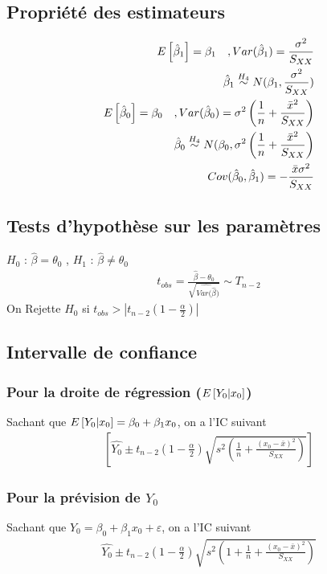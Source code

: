 \documentclass[10pt, french]{article}
\begin{document}
\begin{multicols*}{3}
\subsection*{Propriété des estimateurs}
\begin{align*}
E \left[ \hat{\beta}_1 \right] = \beta_1 \quad , Var(\hat{\beta}_1) = \frac{\sigma^2}{S_{XX}} \\
\hat{\beta}_1 \overset{H_4}{\sim} N(\beta_1, \frac{\sigma^2}{S_{XX}}) \\
E \left[ \hat{\beta}_0 \right] = \beta_0 \quad , Var(\hat{\beta}_0) = \sigma^2 \left( \frac{1}{n} + \frac{\bar{x}^2}{S_{XX}} \right) \\
\hat{\beta}_0 \overset{H_4}{\sim} N(\beta_0, \sigma^2 \left( \frac{1}{n}  + \frac{\bar{x}^2}{S_{XX}} \right) \\
Cov(\hat{\beta}_0, \hat{\beta}_1) = - \frac{\bar{x} \sigma^2}{S_{XX}}
\end{align*}

\subsection*{Tests d'hypothèse sur les paramètres}
$H_0$ : $\hat{\beta} = \theta_0$ , $H_1$ : $\hat{\beta} \neq \theta_0$
\begin{align*}
t_{obs} = \frac{\hat{\beta} - \theta_0}{\sqrt{\hat{Var(\hat{\beta}})}} \sim T_{n-2}
\end{align*}
On Rejette $H_0$ si $t_{obs} > | t_{n-2} (1 - \frac{\alpha}{2})|$

\subsection*{Intervalle de confiance}
\subsubsection*{Pour la droite de régression ($E \left[ Y_0|x_0 \right]$)}
Sachant que $E \left[ Y_0 | x_0 \right] = \beta_0 + \beta_1 x_0$, on a l'IC suivant
\begin{align*}
\left[ \hat{Y_0} \pm t_{n-2} \left(1 - \frac{\alpha}{2} \right) \sqrt{s^2 \left( \frac{1}{n} + \frac{(x_0 - \bar{x})^2}{S_{XX}} \right)} \right]
\end{align*}

\subsubsection*{Pour la prévision de $Y_0$}
Sachant que $Y_0 = \beta_0 + \beta_1 x_0 + \varepsilon$, on a l'IC suivant
\begin{align*}
\hat{Y_0} \pm t_{n-2} \left(1 - \frac{\alpha}{2} \right) \sqrt{s^2 \left( 1 + \frac{1}{n} + \frac{(x_0 - \bar{x})^2}{S_{XX}} \right)}
\end{align*}


\end{multicols*}
\end{document}
